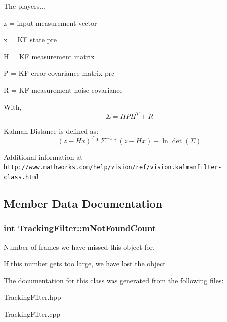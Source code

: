 The players...
\begin{DoxyItemize}
\item z = input measurement vector
\item x = KF state pre
\item H = KF measurement matrix
\item P = KF error covariance matrix pre
\item R = KF measurement noise covariance
\end{DoxyItemize}

With, \[\Sigma = HPH^T + R\]

Kalman Distance is defined as\+: \[(z - Hx)^T * \Sigma^{-1} * (z - Hx) + \ln \det(\Sigma)\]

Additional information at \href{http://www.mathworks.com/help/vision/ref/vision.kalmanfilter-class.html}{\tt http\+://www.\+mathworks.\+com/help/vision/ref/vision.\+kalmanfilter-\/class.\+html} 

\subsection{Member Data Documentation}
\subsubsection[{\texorpdfstring{m\+Not\+Found\+Count}{mNotFoundCount}}]{\setlength{\rightskip}{0pt plus 5cm}int Tracking\+Filter\+::m\+Not\+Found\+Count\hspace{0.3cm}{\ttfamily [protected]}}\hypertarget{classTrackingFilter_a224352476f9f4f23622debefe227e81e}{}\label{classTrackingFilter_a224352476f9f4f23622debefe227e81e}


Number of frames we have missed this object for. 

If this number gets too large, we have lost the object 

The documentation for this class was generated from the following files\+:\begin{DoxyCompactItemize}
\item 
Tracking\+Filter.\+hpp\item 
Tracking\+Filter.\+cpp\end{DoxyCompactItemize}
